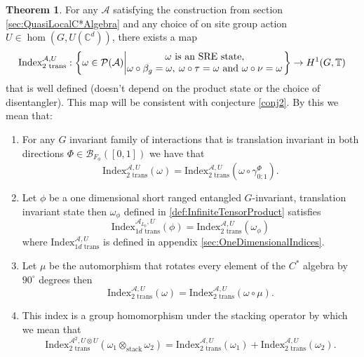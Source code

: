 \documentclass[12pt,a4paper,twoside]{article}
\let\originalleft\left
\let\originalright\right
\renewcommand{\left}{\mathopen{}\mathclose\bgroup\originalleft}
\renewcommand{\right}{\aftergroup\egroup\originalright}
\newcommand{\BB}{\mathcal B}
\newcommand{\PP}{\mathcal P}
\newcommand{\CC}{\mathbb C}
\newcommand{\TT}{\mathbb T}
\renewcommand{\AA}{\mathcal A}
\theoremstyle{definition}
\newtheorem{theorem}{Theorem}[section]
\numberwithin{equation}{section}
\begin{document}
\begin{theorem}
	For any $\AA$ satisfying the construction from section \ref{sec:QuasiLocalC*Algebra} and any choice of on site group action $U\in\hom(G,U(\CC^d))$, there exists a map
	\begin{equation}
		\textrm{Index}_{2\text{ trans}}^{\AA,U}:\left\{\omega\in\PP(\AA)\left| \begin{matrix}\omega\text{ is an SRE state,}\\\omega\circ\beta_g=\omega,\:\omega\circ\tau=\omega\text{ and }\omega\circ\nu=\omega\end{matrix} \right.\right\}\rightarrow H^1(G,\TT)
	\end{equation}
	that is well defined (doesn't depend on the product state or the choice of disentangler). This map will be consistent with conjecture \ref{conj2}. By this we mean that:
	\begin{enumerate}
		\item For any $G$ invariant family of interactions that is translation invariant in both directions $\Phi\in\BB_{F_\phi}([0,1])$ we have that
		\begin{equation}
			\textrm{Index}_{2\text{ trans}}^{\AA,U}(\omega)=\textrm{Index}_{2\text{ trans}}^{\AA,U}(\omega\circ\gamma^\Phi_{0;1}).
		\end{equation}
		\item Let $\phi$ be a one dimensional short ranged entangled $G$-invariant, translation invariant state then $\omega_\phi$ defined in \ref{def:InfiniteTensorProduct} satisfies
		\begin{equation}
			\textrm{Index}_{1d\text{ trans}}^{\AA_{L_0},U}(\phi)=\text{Index}_{2\text{ trans}}^{\AA,U}(\omega_\phi)
		\end{equation}
		where $\textrm{Index}_{1d\text{ trans}}^{\AA,U}$ is defined in appendix \ref{sec:OneDimensionalIndices}.
		\item Let $\mu$ be the automorphism that rotates every element of the $C^*$ algebra by $90^\circ$ degrees then
		\begin{equation}
			\textrm{Index}_{\text{2 trans}}^{\AA,U}(\omega)=\textrm{Index}_{\text{2 trans}}^{\AA,U}(\omega\circ\mu).
		\end{equation}
		\item This index is a group homomorphism under the stacking operator by which we mean that
		\begin{equation}
			\textrm{Index}_{\text{2 trans}}^{\AA^2,U\otimes U}(\omega_1\otimes_{\text{stack}}\omega_2)=\textrm{Index}_{\text{2 trans}}^{\AA,U}(\omega_1)+\textrm{Index}_{\text{2 trans}}^{\AA,U}(\omega_2).
		\end{equation}
	\end{enumerate}
\end{theorem}
\end{document}
